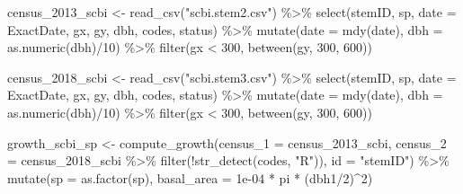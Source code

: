 \documentclass[12pt]{article}
\newenvironment{Shaded}{\begin{snugshade}}{\end{snugshade}}
\newcommand{\AttributeTok}[1]{\textcolor[rgb]{0.77,0.63,0.00}{#1}}
\newcommand{\DecValTok}[1]{\textcolor[rgb]{0.00,0.00,0.81}{#1}}
\newcommand{\FloatTok}[1]{\textcolor[rgb]{0.00,0.00,0.81}{#1}}
\newcommand{\FunctionTok}[1]{\textcolor[rgb]{0.00,0.00,0.00}{#1}}
\newcommand{\NormalTok}[1]{#1}
\newcommand{\OtherTok}[1]{\textcolor[rgb]{0.56,0.35,0.01}{#1}}
\newcommand{\SpecialCharTok}[1]{\textcolor[rgb]{0.00,0.00,0.00}{#1}}
\newcommand{\StringTok}[1]{\textcolor[rgb]{0.31,0.60,0.02}{#1}}
\begin{document}
\begin{Shaded}
\begin{Highlighting}[]
\NormalTok{census\_2013\_scbi }\OtherTok{\textless{}{-}} \FunctionTok{read\_csv}\NormalTok{(}\StringTok{"scbi.stem2.csv"}\NormalTok{) }\SpecialCharTok{\%\textgreater{}\%}
    \FunctionTok{select}\NormalTok{(stemID, sp, }\AttributeTok{date =}\NormalTok{ ExactDate, gx, gy, dbh, codes, status) }\SpecialCharTok{\%\textgreater{}\%}
    \FunctionTok{mutate}\NormalTok{(}\AttributeTok{date =} \FunctionTok{mdy}\NormalTok{(date), }\AttributeTok{dbh =} \FunctionTok{as.numeric}\NormalTok{(dbh)}\SpecialCharTok{/}\DecValTok{10}\NormalTok{) }\SpecialCharTok{\%\textgreater{}\%}
    \FunctionTok{filter}\NormalTok{(gx }\SpecialCharTok{\textless{}} \DecValTok{300}\NormalTok{, }\FunctionTok{between}\NormalTok{(gy, }\DecValTok{300}\NormalTok{, }\DecValTok{600}\NormalTok{))}

\NormalTok{census\_2018\_scbi }\OtherTok{\textless{}{-}} \FunctionTok{read\_csv}\NormalTok{(}\StringTok{"scbi.stem3.csv"}\NormalTok{) }\SpecialCharTok{\%\textgreater{}\%}
    \FunctionTok{select}\NormalTok{(stemID, sp, }\AttributeTok{date =}\NormalTok{ ExactDate, gx, gy, dbh, codes, status) }\SpecialCharTok{\%\textgreater{}\%}
    \FunctionTok{mutate}\NormalTok{(}\AttributeTok{date =} \FunctionTok{mdy}\NormalTok{(date), }\AttributeTok{dbh =} \FunctionTok{as.numeric}\NormalTok{(dbh)}\SpecialCharTok{/}\DecValTok{10}\NormalTok{) }\SpecialCharTok{\%\textgreater{}\%}
    \FunctionTok{filter}\NormalTok{(gx }\SpecialCharTok{\textless{}} \DecValTok{300}\NormalTok{, }\FunctionTok{between}\NormalTok{(gy, }\DecValTok{300}\NormalTok{, }\DecValTok{600}\NormalTok{))}

\NormalTok{growth\_scbi\_sp }\OtherTok{\textless{}{-}} \FunctionTok{compute\_growth}\NormalTok{(}\AttributeTok{census\_1 =}\NormalTok{ census\_2013\_scbi, }\AttributeTok{census\_2 =}\NormalTok{ census\_2018\_scbi }\SpecialCharTok{\%\textgreater{}\%}
    \FunctionTok{filter}\NormalTok{(}\SpecialCharTok{!}\FunctionTok{str\_detect}\NormalTok{(codes, }\StringTok{"R"}\NormalTok{)), }\AttributeTok{id =} \StringTok{"stemID"}\NormalTok{) }\SpecialCharTok{\%\textgreater{}\%}
    \FunctionTok{mutate}\NormalTok{(}\AttributeTok{sp =} \FunctionTok{as.factor}\NormalTok{(sp), }\AttributeTok{basal\_area =} \FloatTok{1e{-}04} \SpecialCharTok{*}\NormalTok{ pi }\SpecialCharTok{*}\NormalTok{ (dbh1}\SpecialCharTok{/}\DecValTok{2}\NormalTok{)}\SpecialCharTok{\^{}}\DecValTok{2}\NormalTok{)}


\end{Highlighting}
\end{Shaded}
\end{document}
